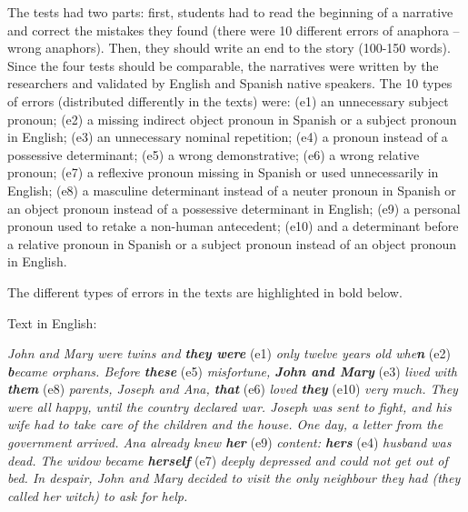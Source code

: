 \documentclass{textolivre}
\begin{document}
The tests had two parts: first, students had to read the beginning of a
narrative and correct the mistakes they found (there were 10 different
errors of anaphora -- wrong anaphors). Then, they should write an end to
the story (100-150 words). Since the four tests should be comparable,
the narratives were written by the researchers and validated by English
and Spanish native speakers. The 10 types of errors (distributed
differently in the texts) were: (e1) an unnecessary subject pronoun;
(e2) a missing indirect object pronoun in Spanish or a subject pronoun
in English; (e3) an unnecessary nominal repetition; (e4) a pronoun
instead of a possessive determinant; (e5) a wrong demonstrative; (e6) a
wrong relative pronoun; (e7) a reflexive pronoun missing in Spanish or
used unnecessarily in English; (e8) a masculine determinant instead of a
neuter pronoun in Spanish or an object pronoun instead of a possessive
determinant in English; (e9) a personal pronoun used to retake a
non-human antecedent; (e10) and a determinant before a relative pronoun
in Spanish or a subject pronoun instead of an object pronoun in
English.

The different types of errors in the texts are highlighted in bold
below.

\vspace{1ex}
\begin{samepage}
Text in English:

\nopagebreak
\emph{John and Mary were twins and \textbf{they were}} (e1) \emph{only
twelve years old whe\textbf{n}} (e2) \emph{\textbf{b}ecame orphans.
Before \textbf{these}} (e5) \emph{misfortune, \textbf{John and Mary}}
(e3) \emph{lived with \textbf{them}} (e8) \emph{parents, Joseph and Ana,
\textbf{that}} (e6) \emph{loved \textbf{they}} (e10) \emph{very much.
They were all happy, until the country declared war. Joseph was sent to
fight, and his wife had to take care of the children and the house. One
day, a letter from the government arrived. Ana already knew
\textbf{her}} (e9) \emph{content: \textbf{hers}} (e4) \emph{husband was
dead. The widow became \textbf{herself}} (e7) \emph{deeply depressed and
could not get out of bed. In despair, John and Mary decided to visit the
only neighbour they had (they called her witch) to ask for help.}
\end{samepage}
\end{document}
